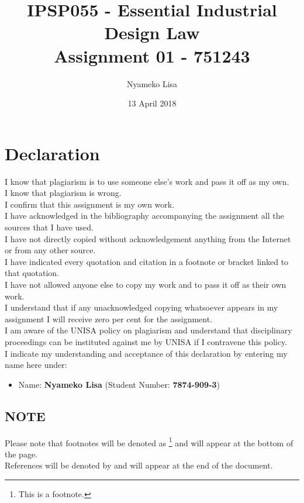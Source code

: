 \documentclass[11pt]{article}
\author{Nyameko Lisa}
\date{13 April 2018}
\title{IPSP055 - Essential Industrial Design Law\\\medskip
\large Assignment 01 - 751243}
\begin{document}
\maketitle
\addvspace{110pt}

\justifying
\addvspace{110pt}
\section*{Declaration}
\label{sec:org8fb61e9}
I know that plagiarism is to use someone else’s work and pass it off as my own.\\
I know that plagiarism is wrong.\\
I confirm that this assignment is my own work.\\
I have acknowledged in the bibliography accompanying the assignment all the sources that I have used.\\
I have not directly copied without acknowledgement anything from the Internet or from any other source.\\
I have indicated every quotation and citation in a footnote or bracket linked to that quotation.\\
I have not allowed anyone else to copy my work and to pass it off as their own work.\\
I understand that if any unacknowledged copying whatsoever appears in my assignment I will receive zero per cent for the assignment.\\
I am aware of the UNISA policy on plagiarism and understand that disciplinary proceedings can be instituted against me by UNISA if I contravene this policy.\\
I indicate my understanding and acceptance of this declaration by
entering my name here under:
\begin{itemize}
\item Name: \textbf{Nyameko Lisa} (Student Number: \textbf{7874-909-3})
\end{itemize}

\subsection*{NOTE}
\label{sec:org0782d60}
Please note that footnotes will be denoted as \footnote{This is a footnote.} and will
appear at the bottom of the page.\\
References will be denoted by \cite{rsa93_designs_act} and will appear at the end of the document.
\newpage
\end{document}
